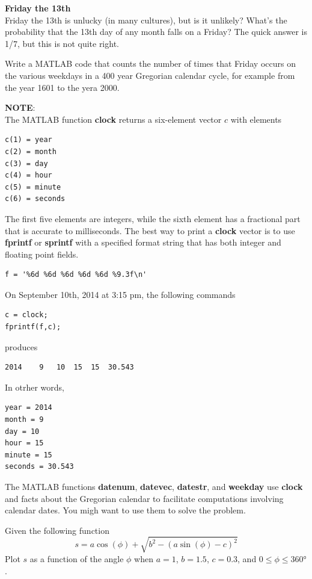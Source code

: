 \documentclass[12pt]{TDTP}
\begin{document}
\Exo
\textbf{Friday  the 13th}\\
Friday the 13th is unlucky (in many cultures), but is it unlikely?
What's the probability that the 13th day of any month falls on a Friday?
The quick answer is 1/7, but this is not quite right.

Write a MATLAB code that counts the number of times that Friday occurs on the various weekdays in a 400 year Gregorian calendar cycle, for example from the year 1601 to the yera 2000.

\bigskip
\textbf{NOTE}:\\
The MATLAB function \textbf{clock} returns a six-element vector $c$ with elements
\begin{verbatim}
c(1) = year
c(2) = month
c(3) = day
c(4) = hour
c(5) = minute
c(6) = seconds
\end{verbatim}

The first five elements are integers, while the sixth element has a fractional part that is accurate to milliseconds. 
The best way to print a \textbf{clock} vector is to use \textbf{fprintf} or \textbf{sprintf} with a specified format string that has both integer and floating point fields.

\begin{verbatim}
f = '%6d %6d %6d %6d %6d %9.3f\n'
\end{verbatim}

On September 10th, 2014 at 3:15 pm, the following commands

\begin{verbatim}
c = clock;
fprintf(f,c);
\end{verbatim}

produces

\begin{verbatim}
2014	9	10	15	15	30.543
\end{verbatim}

In otrher words,

\begin{verbatim}
year = 2014
month = 9
day = 10
hour = 15
minute = 15
seconds = 30.543
\end{verbatim}

The MATLAB functions \textbf{datenum}, \textbf{datevec}, \textbf{datestr}, and \textbf{weekday} use \textbf{clock} and facts about the Gregorian calendar to facilitate computations involving calendar dates.
You migh want to use them to solve the problem.

\Exo
Given the following function
$$
s = a \cos(\phi) + \sqrt{b^2 - (a\sin(\phi)-c)^2}
$$
Plot $s$ as a function of the angle $\phi$ when $a=1$, $b=1.5$, $c=0.3$, and $0\leq \phi \leq 360°$.
\end{document}
